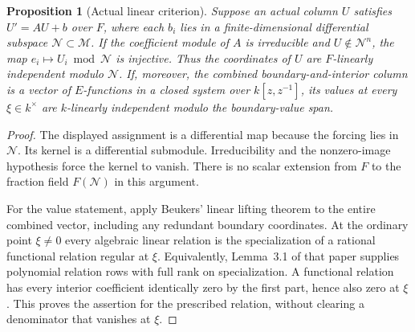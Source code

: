 \documentclass[11pt]{article}
\numberwithin{equation}{section}
\newtheorem{proposition}[proposition]{Proposition}
\theoremstyle{definition}
\theoremstyle{remark}
\newcommand{\M}{\mathscr M}
\newcommand{\Ncal}{\mathcal N}
\begin{document}
\begin{proposition}[Actual linear criterion]\label{prop:linear-criterion}
Suppose an actual column $U$ satisfies $U'=AU+b$ over $F$, where each
$b_i$ lies in a finite-dimensional differential subspace $\Ncal\subset\M$.
If the coefficient module of $A$ is irreducible and $U\notin\Ncal^n$, the
map $e_i\mapsto U_i\bmod\Ncal$ is injective. Thus the coordinates of $U$
are $F$-linearly independent modulo $\Ncal$.
If, moreover, the combined boundary-and-interior column is a vector of
$E$-functions in a closed system over $k[z,z^{-1}]$, its values at every
$\xi\in k^\times$ are $k$-linearly independent modulo the boundary-value span.
\end{proposition}
\begin{proof}
The displayed assignment is a differential map because the forcing lies in
$\Ncal$. Its kernel is a differential submodule. Irreducibility and the
nonzero-image hypothesis force the kernel to vanish. There is no scalar
extension from $F$ to the fraction field $F(\Ncal)$ in this argument.

For the value statement, apply Beukers' linear lifting theorem
\cite[Theorem~3.2, p.~375]{Beukers} to the entire combined vector, including
any redundant boundary coordinates. At the ordinary point $\xi\ne0$ every
algebraic linear relation is the specialization of a rational functional
relation regular at $\xi$. Equivalently, Lemma~3.1 of that paper supplies
polynomial relation rows with full rank on specialization. A functional
relation has every interior coefficient identically zero by the first
part, hence also zero at $\xi$. This proves the assertion for the prescribed
relation, without clearing a denominator that vanishes at $\xi$.
\end{proof}
\end{document}
